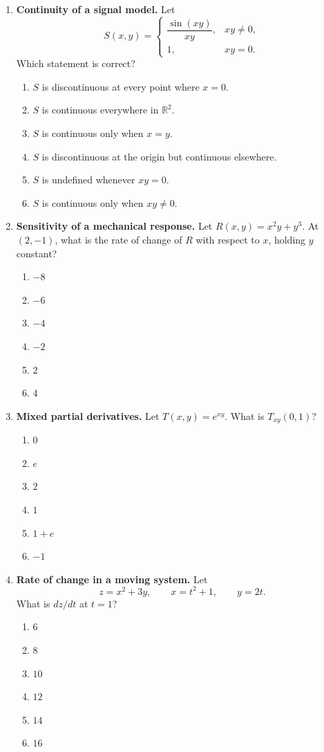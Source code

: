 \documentclass[a4paper,12pt]{article}
\theoremstyle{mystyle}
\numberwithin{equation}{section}
\numberwithin{theorem}{section}
\numberwithin{proposition}{section}
\numberwithin{example}{section}
\numberwithin{remark}{section}
\numberwithin{lemma}{section}
\numberwithin{corollary}{section}
\numberwithin{definition}{section}
\begin{document}
\begin{enumerate}[label=\textbf{Question \arabic*.},leftmargin=*]
\item \textbf{Continuity of a signal model.} Let
\[
S(x,y)=
\begin{cases}
\dfrac{\sin(xy)}{xy},&xy\ne0,\\[4pt]
1,&xy=0.
\end{cases}
\]
Which statement is correct?
\begin{enumerate}[label=(\Alph*)]
\item $S$ is discontinuous at every point where $x=0$.
\item $S$ is continuous everywhere in $\mathbb R^2$.
\item $S$ is continuous only when $x=y$.
\item $S$ is discontinuous at the origin but continuous elsewhere.
\item $S$ is undefined whenever $xy=0$.
\item $S$ is continuous only when $xy\ne0$.
\end{enumerate}

\item \textbf{Sensitivity of a mechanical response.} Let $R(x,y)=x^2y+y^3$. At $(2,-1)$, what is the rate of change of $R$ with respect to $x$, holding $y$ constant?
\begin{enumerate}[label=(\Alph*)]
\item $-8$
\item $-6$
\item $-4$
\item $-2$
\item $2$
\item $4$
\end{enumerate}

\item \textbf{Mixed partial derivatives.} Let $T(x,y)=e^{xy}$. What is $T_{xy}(0,1)$?
\begin{enumerate}[label=(\Alph*)]
\item $0$
\item $e$
\item $2$
\item $1$
\item $1+e$
\item $-1$
\end{enumerate}

\item \textbf{Rate of change in a moving system.} Let
\[
z=x^2+3y,\qquad x=t^2+1,\qquad y=2t.
\]
What is $dz/dt$ at $t=1$?
\begin{enumerate}[label=(\Alph*)]
\item $6$
\item $8$
\item $10$
\item $12$
\item $14$
\item $16$
\end{enumerate}


\end{enumerate}
\end{document}
